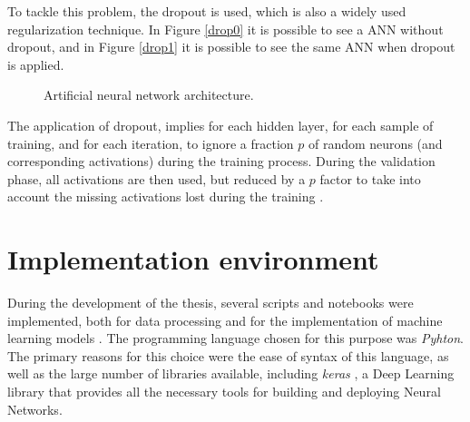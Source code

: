To tackle this problem, the dropout is used, which is also a widely used regularization technique. In Figure \ref{drop0} it is possible to see a \ac{ANN} without dropout, and in Figure \ref{drop1} it is possible to see the same \ac{ANN} when dropout is applied.

\begin{figure}[h!]
\captionsetup[subfigure]{position=b}
\centering
\label{fig:drop}
\hspace{0.05\textwidth}
\caption{Artificial neural network architecture.}
\end{figure}

The application of dropout, implies for each hidden layer, for each sample of training, and for each iteration, to ignore a fraction $p$ of random neurons (and corresponding activations) during the training process. During the validation phase, all activations are then used, but reduced by a $p$ factor to take into account the missing activations lost during the training \cite{drop0}.

\section{Implementation environment}\label{chap3:sec:implementation_enviromnet}

During the development of the thesis, several scripts and notebooks were implemented, both for data processing and for the implementation of machine learning models \cite{code}. The programming language chosen for this purpose was \textit{Pyhton}. The primary reasons for this choice were the ease of syntax of this language, as well as the large number of libraries available, including \textit{keras} \cite{keras}, a Deep Learning library that provides all the necessary tools for building and deploying Neural Networks.

